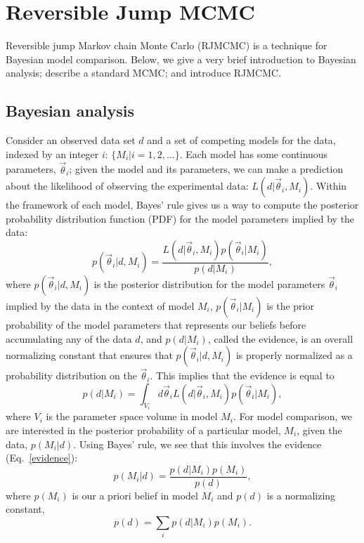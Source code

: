 \documentclass[prd,preprint]{revtex4}
\newcommand{\vtheta}{\vec{\theta}}
\newcommand{\be}{\begin{equation}}
\newcommand{\ee}{\end{equation}}
\newcommand{\bel}[1]{\begin{equation}\label{#1}}
\begin{document}
\section{Reversible Jump MCMC}

Reversible jump Markov chain Monte Carlo (RJMCMC) \cite{Green1995} is a technique for Bayesian model comparison.  Below, we give a very brief introduction to Bayesian analysis; describe a standard MCMC; and introduce RJMCMC.

\subsection{Bayesian analysis}

Consider an observed data set $d$ and a set of competing models for
the data, indexed by an integer $i$: $\{M_i | i = 1, 2, \ldots \}$.
Each model has some continuous parameters, $\vtheta_i$; given the
model and its parameters, we can make a prediction about the
likelihood of observing the experimental data: $L(d|\vtheta_i, M_i)$.
Within the framework of each model, Bayes' rule gives us a way to
compute the posterior probability distribution function (PDF) for the
model parameters implied by the data:
\be
  p(\vtheta_i | d, M_i) = \frac{L(d|\vtheta_i, M_i) p(\vtheta_i|M_i)}{p(d|M_i)},
\ee
where $p(\vtheta_i |d, M_i)$ is the posterior distribution for the
model parameters $\vtheta_i$ implied by the data in the context of
model $M_i$, $p(\vtheta_i|M_i)$ is the prior probability of the model
parameters that represents our beliefs before accumulating any of the
data $d$, and $p(d|M_i)$, called the evidence, is an overall
normalizing constant that ensures that $p(\vtheta_i|d,M_i)$ is
properly normalized as a probability distribution on the $\vtheta_i$.
This implies that the evidence is equal to
\bel{evidence}
  p(d|M_i) = \int_{V_i} d\vtheta_i L(d|\vtheta_i, M_i) p(\vtheta_i|M_i),
\ee
where $V_i$ is the parameter space volume in model $M_i$.  For model
comparison, we are interested in the posterior probability of a
particular model, $M_i$, given the data, $p(M_i|d)$.  Using Bayes'
rule, we see that this involves the evidence (Eq.~\eqref{evidence}):
\be
p(M_i|d) = \frac{p(d|M_i) p(M_i)}{p(d)},
\ee
where $p(M_i)$ is our a priori belief in model $M_i$ and $p(d)$ is a
normalizing constant,
\be
p(d)=\sum_i p(d|M_i) p(M_i).
\ee
\end{document}

